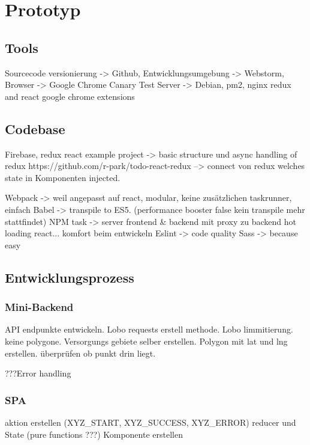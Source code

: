 \chapter{Prototyp}
\label{sec:prototyp}

\section{Tools}
Sourcecode versionierung -> Github,
Entwicklungsumgebung -> Webstorm,
Browser -> Google Chrome Canary
Test Server -> Debian, pm2, nginx
redux and react google chrome extensions

\section{Codebase}
Firebase, redux react example project -> basic structure und async handling of redux https://github.com/r-park/todo-react-redux
--> connect von redux welches state in Komponenten injected.

Webpack -> weil angepasst auf react, modular, keine zusätzlichen taskrunner, einfach
Babel -> transpile to ES5. (performance booster false kein transpile mehr stattfindet)
NPM task -> server frontend & backend mit proxy zu backend hot loading react... komfort beim entwickeln
Eslint -> code quality
Sass -> because easy

\section{Entwicklungsprozess}
\subsection{Mini-Backend}
API endpunkte entwickeln.
Lobo requests erstell methode.
Lobo limmitierung. keine polygone. Versorgungs gebiete selber erstellen. Polygon mit lat und lng erstellen. überprüfen ob punkt drin liegt.

???Error handling


\subsection{SPA}
aktion erstellen (XYZ_START, XYZ_SUCCESS, XYZ_ERROR)
reducer und State (pure functions ???)
Komponente erstellen




